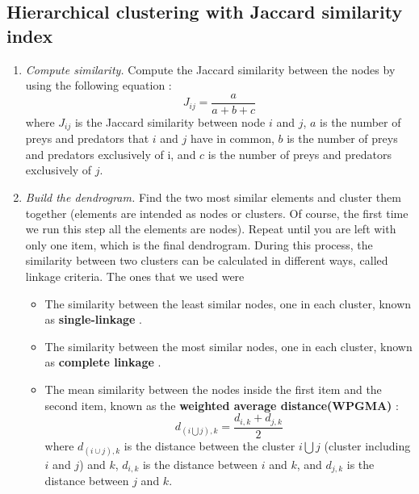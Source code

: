 \documentclass[twocolumn]{article}
\begin{document}
\begin{appendices}
	\section{Hierarchical clustering with Jaccard similarity index}
	\label{appendix:a}
		\begin{enumerate}
			\item \emph{Compute similarity.} \smallskip \newline
						Compute the Jaccard similarity between the nodes by using the following equation \citep{Yodzis1999}:
						\begin{equation}
				      J_{ij}=\frac{a}{a+b+c} \label{eqn:jaccard}
			      \end{equation}
			      where $J_{ij}$ is the Jaccard similarity between node $i$ and $j$, $a$ is the number of preys and predators that $i$ and $j$ have in common, $b$ is the number of preys and predators exclusively of i, and $c$ is the number of preys and predators exclusively of $j$.
			\item \emph{Build the dendrogram.} \smallskip \newline
			      Find the two most similar elements and cluster them together (elements are intended as nodes or clusters. Of course, the first time we run this step all the elements are nodes). Repeat until you are left with only one item, which is the final dendrogram. During this process, the similarity between two clusters can be calculated in different ways, called linkage criteria. The ones that we used were
			      \begin{itemize}
				      \item 	The similarity between the least similar nodes, one in each cluster, known as \textbf{single-linkage} \citep{Frigui2008}.
				      \item 	The similarity between the most similar nodes, one in each cluster, known as \textbf{complete linkage} \citep{Frigui2008}.
				      \item 	The mean similarity between the nodes inside the first item and the second item, known as the \textbf{weighted average distance(WPGMA)} \citep{Sokal1958}:
				            \begin{equation}
					            d_{(i \bigcup j),k}=\frac{d_{i,k}+d_{j,k}}{2} \label{eqn:WPGMA}
				            \end{equation}
	            where $d_{\left(i\cup j\right),k}$ is the distance between the cluster $i \bigcup j$ (cluster including $i$ and $j$) and $k$, $d_{i,k}$ is the distance between $i$ and $k$, and  $d_{j,k}$ is the distance between $j$ and $k$.

\end{itemize}
\end{enumerate}
\end{appendices}
\end{document}
